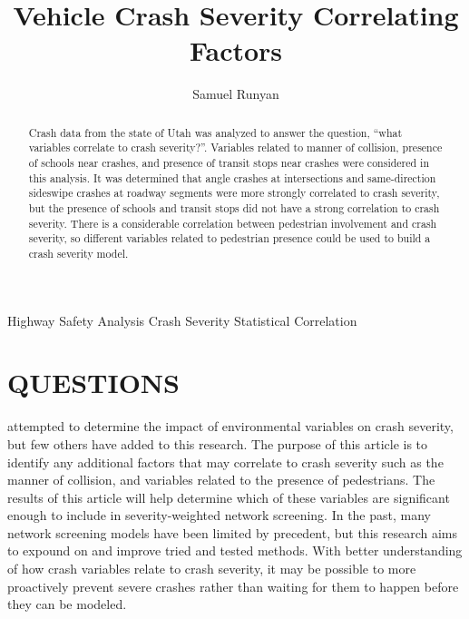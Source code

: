 \documentclass[3p, authoryear]{elsarticle} %
\begin{document}
\begin{frontmatter}

  \title{Vehicle Crash Severity Correlating Factors}
    \author[Brigham Young University]{Samuel Runyan}
      \address[Brigham Young University]{Civil and Environmental Engineering Department, 430 Engineering Building, Provo, Utah 84602}
    
  \begin{abstract}
  Crash data from the state of Utah was analyzed to answer the question, ``what variables correlate to crash severity?''. Variables related to manner of collision, presence of schools near crashes, and presence of transit stops near crashes were considered in this analysis. It was determined that angle crashes at intersections and same-direction sideswipe crashes at roadway segments were more strongly correlated to crash severity, but the presence of schools and transit stops did not have a strong correlation to crash severity. There is a considerable correlation between pedestrian involvement and crash severity, so different variables related to pedestrian presence could be used to build a crash severity model.
  \end{abstract}
   \begin{keyword} Highway Safety Analysis Crash Severity Statistical Correlation\end{keyword}
 \end{frontmatter}

\hypertarget{intro}{%
\section{QUESTIONS}\label{intro}}

\citet{ghadi2020} attempted to determine the impact of environmental variables on crash severity, but few others have added to this research. The purpose of this article is to identify any additional factors that may correlate to crash severity such as the manner of collision, and variables related to the presence of pedestrians. The results of this article will help determine which of these variables are significant enough to include in severity-weighted network screening. In the past, many network screening models have been limited by precedent, but this research aims to expound on and improve tried and tested methods. With better understanding of how crash variables relate to crash severity, it may be possible to more proactively prevent severe crashes rather than waiting for them to happen before they can be modeled.
\end{document}
